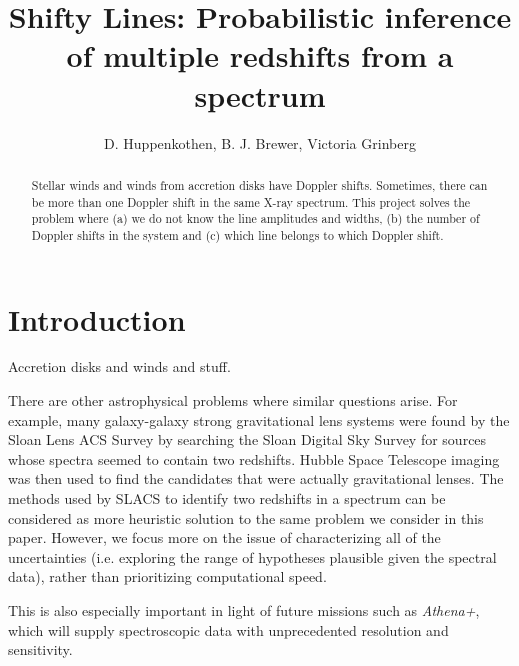 \documentclass[12pt]{emulateapj}
\begin{document}
\title{Shifty Lines: Probabilistic inference of multiple redshifts from a spectrum}

\author{D. Huppenkothen, B. J. Brewer, Victoria Grinberg}
 


\begin{abstract}
Stellar winds and winds from accretion disks have Doppler shifts. Sometimes, there can be more than one Doppler shift in 
the same X-ray spectrum. This project solves the problem where (a) we do not know the line amplitudes and widths, (b) the 
number of Doppler shifts in the system and (c) which line belongs to which Doppler shift.

\end{abstract}


\section{Introduction}

Accretion disks and winds and stuff.

There are other astrophysical problems where similar questions arise. For
example, many galaxy-galaxy strong gravitational lens systems were
found by the Sloan Lens ACS Survey \citep[SLACS;][]{slacs0, slacs1} by searching
the Sloan Digital Sky Survey for sources whose spectra seemed to contain two
redshifts. Hubble Space Telescope imaging was then used to find the candidates
that were actually gravitational lenses.
The methods used by SLACS to identify two redshifts in a spectrum can be
considered as more heuristic solution to the same problem we consider in this
paper. However, we focus more on the issue of characterizing all of the
uncertainties (i.e. exploring the range of hypotheses plausible given the
spectral data), rather than prioritizing computational speed.

This is also especially important in light of future missions such as \textit{Athena+}, which 
will supply spectroscopic data with unprecedented resolution and sensitivity.
\end{document}
